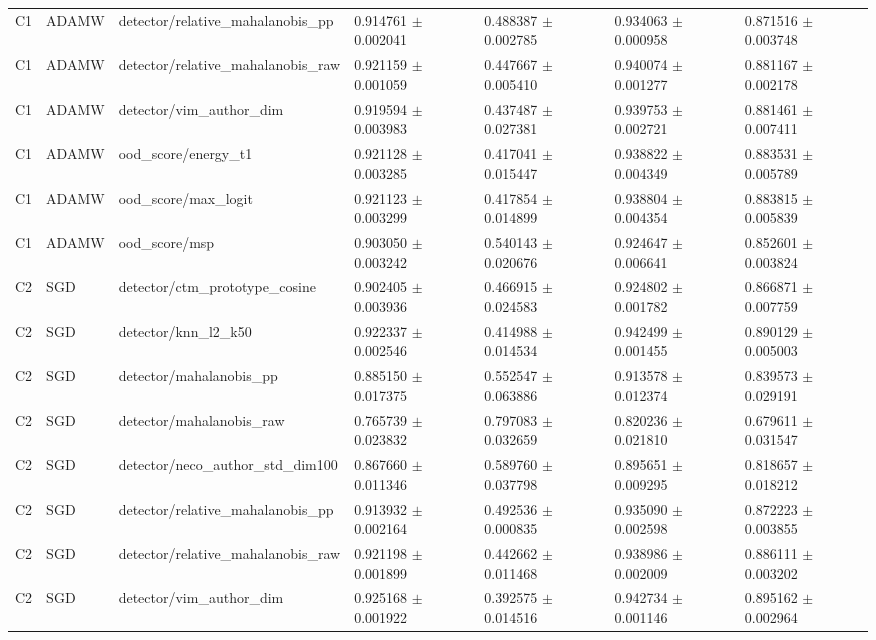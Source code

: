 \begin{longtable}{lllllll}
C1 & ADAMW & detector/relative\_mahalanobis\_pp & 0.914761 $\pm$ 0.002041 & 0.488387 $\pm$ 0.002785 & 0.934063 $\pm$ 0.000958 & 0.871516 $\pm$ 0.003748 \\
C1 & ADAMW & detector/relative\_mahalanobis\_raw & 0.921159 $\pm$ 0.001059 & 0.447667 $\pm$ 0.005410 & 0.940074 $\pm$ 0.001277 & 0.881167 $\pm$ 0.002178 \\
C1 & ADAMW & detector/vim\_author\_dim & 0.919594 $\pm$ 0.003983 & 0.437487 $\pm$ 0.027381 & 0.939753 $\pm$ 0.002721 & 0.881461 $\pm$ 0.007411 \\
C1 & ADAMW & ood\_score/energy\_t1 & 0.921128 $\pm$ 0.003285 & 0.417041 $\pm$ 0.015447 & 0.938822 $\pm$ 0.004349 & 0.883531 $\pm$ 0.005789 \\
C1 & ADAMW & ood\_score/max\_logit & 0.921123 $\pm$ 0.003299 & 0.417854 $\pm$ 0.014899 & 0.938804 $\pm$ 0.004354 & 0.883815 $\pm$ 0.005839 \\
C1 & ADAMW & ood\_score/msp & 0.903050 $\pm$ 0.003242 & 0.540143 $\pm$ 0.020676 & 0.924647 $\pm$ 0.006641 & 0.852601 $\pm$ 0.003824 \\
C2 & SGD & detector/ctm\_prototype\_cosine & 0.902405 $\pm$ 0.003936 & 0.466915 $\pm$ 0.024583 & 0.924802 $\pm$ 0.001782 & 0.866871 $\pm$ 0.007759 \\
C2 & SGD & detector/knn\_l2\_k50 & 0.922337 $\pm$ 0.002546 & 0.414988 $\pm$ 0.014534 & 0.942499 $\pm$ 0.001455 & 0.890129 $\pm$ 0.005003 \\
C2 & SGD & detector/mahalanobis\_pp & 0.885150 $\pm$ 0.017375 & 0.552547 $\pm$ 0.063886 & 0.913578 $\pm$ 0.012374 & 0.839573 $\pm$ 0.029191 \\
C2 & SGD & detector/mahalanobis\_raw & 0.765739 $\pm$ 0.023832 & 0.797083 $\pm$ 0.032659 & 0.820236 $\pm$ 0.021810 & 0.679611 $\pm$ 0.031547 \\
C2 & SGD & detector/neco\_author\_std\_dim100 & 0.867660 $\pm$ 0.011346 & 0.589760 $\pm$ 0.037798 & 0.895651 $\pm$ 0.009295 & 0.818657 $\pm$ 0.018212 \\
C2 & SGD & detector/relative\_mahalanobis\_pp & 0.913932 $\pm$ 0.002164 & 0.492536 $\pm$ 0.000835 & 0.935090 $\pm$ 0.002598 & 0.872223 $\pm$ 0.003855 \\
C2 & SGD & detector/relative\_mahalanobis\_raw & 0.921198 $\pm$ 0.001899 & 0.442662 $\pm$ 0.011468 & 0.938986 $\pm$ 0.002009 & 0.886111 $\pm$ 0.003202 \\
C2 & SGD & detector/vim\_author\_dim & 0.925168 $\pm$ 0.001922 & 0.392575 $\pm$ 0.014516 & 0.942734 $\pm$ 0.001146 & 0.895162 $\pm$ 0.002964 \\

\end{longtable}
